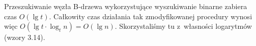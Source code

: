\exercise %
\exercise %
\exercise %
Przeszukiwanie węzła B-drzewa wykorzystujące wyszukiwanie binarne zabiera czas $O(\lg t)$.
Całkowity czas działania tak zmodyfikowanej procedury  wynosi więc $O(\lg t\cdot\log_tn)=O(\lg n)$.
Skorzystaliśmy tu z~własności logarytmów (wzory 3.14).

\exercise %
